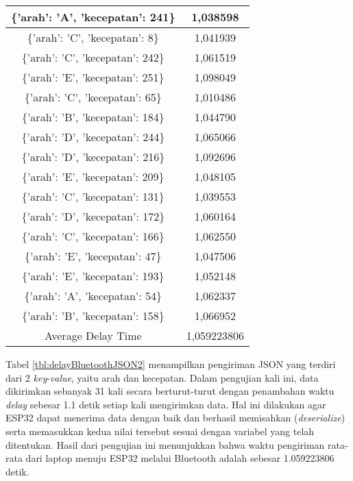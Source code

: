 \begin{table}[!h]
\begin{tabular}{|c|c|}
  \{'arah': 'A', 'kecepatan': 241\} & 1,038598    \\ \hline
  \{'arah': 'C', 'kecepatan': 8\}   & 1,041939    \\ \hline
  \{'arah': 'C', 'kecepatan': 242\} & 1,061519    \\ \hline
  \{'arah': 'E', 'kecepatan': 251\} & 1,098049    \\ \hline
  \{'arah': 'C', 'kecepatan': 65\}  & 1,010486    \\ \hline
  \{'arah': 'B', 'kecepatan': 184\} & 1,044790    \\ \hline
  \{'arah': 'D', 'kecepatan': 244\} & 1,065066    \\ \hline
  \{'arah': 'D', 'kecepatan': 216\} & 1,092696    \\ \hline
  \{'arah': 'E', 'kecepatan': 209\} & 1,048105    \\ \hline
  \{'arah': 'C', 'kecepatan': 131\} & 1,039553    \\ \hline
  \{'arah': 'D', 'kecepatan': 172\} & 1,060164    \\ \hline
  \{'arah': 'C', 'kecepatan': 166\} & 1,062550    \\ \hline
  \{'arah': 'E', 'kecepatan': 47\}  & 1,047506    \\ \hline
  \{'arah': 'E', 'kecepatan': 193\} & 1,052148    \\ \hline
  \{'arah': 'A', 'kecepatan': 54\}  & 1,062337    \\ \hline
  \{'arah': 'B', 'kecepatan': 158\} & 1,066952    \\ \hline
  Average Delay Time                & 1,059223806 \\ \hline
  \end{tabular}
\end{table}

Tabel \ref{tbl:delayBluetoothJSON2} menampilkan pengiriman JSON yang terdiri dari 2 \emph{key}-\emph{value}, yaitu arah dan kecepatan. Dalam pengujian kali ini, data dikirimkan sebanyak 31 kali secara berturut-turut dengan penambahan waktu \emph{delay} sebesar 1.1 detik setiap kali mengirimkan data. Hal ini dilakukan agar ESP32 dapat menerima data dengan baik dan berhasil memisahkan (\emph{deserialize}) serta memasukkan kedua nilai tersebut sesuai dengan variabel yang telah ditentukan. Hasil dari pengujian ini menunjukkan bahwa waktu pengiriman rata-rata dari laptop menuju ESP32 melalui Bluetooth adalah sebesar 1.059223806 detik.

